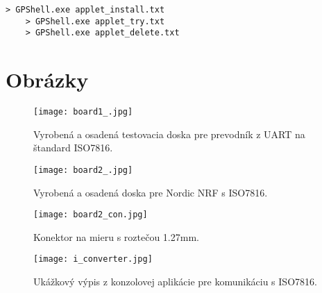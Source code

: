 \documentclass[12pt,a4paper,oneside,openright]{report}
\renewcommand\lstlistingname{Ukážka kódu}
\begin{document}
\renewcommand\lstlistingname{}
	\begin{lstlisting}[caption={Nainštalovanie appletu cez nástroj GPShell.}, label={lst:gpshell}] 
	> GPShell.exe applet_install.txt
	> GPShell.exe applet_try.txt
	> GPShell.exe applet_delete.txt
	\end{lstlisting}


\chapter{Obrázky} \label{s_pictures}
\begin{figure*}[h]
	\centering
	\texttt{[image: board1\_.jpg]}
	\caption{Vyrobená a osadená testovacia doska pre prevodník z UART na štandard ISO7816.}
	\label{f:i_board_iso}
\end{figure*}

\begin{figure*}[h]
	\centering
	\texttt{[image: board2\_.jpg]}
	\caption{Vyrobená a osadená doska pre Nordic NRF s ISO7816.}
	\label{f:i_board_nrf}
\end{figure*}

\begin{figure*}[h]
	\centering
	\texttt{[image: board2\_con.jpg]}
	\caption{Konektor na mieru s roztečou 1.27mm.}
	\label{f:i_board2}
\end{figure*}


\begin{figure*}[h]
	\centering
	\texttt{[image: i\_converter.jpg]}
	\caption{Ukážkový výpis z konzolovej aplikácie pre komunikáciu s ISO7816.}
	\label{f:i_iso_dekoder}
\end{figure*}
\end{document}
